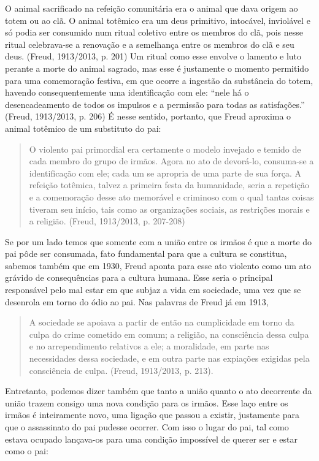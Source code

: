 O animal sacrificado na refeição comunitária era o animal que dava
origem ao totem ou ao clã. O animal totêmico era um deus primitivo,
intocável, inviolável e só podia ser consumido num ritual coletivo entre
os membros do clã, pois nesse ritual celebrava-se a renovação e a
semelhança entre os membros do clã e seu deus. (Freud, 1913/2013, p.
201) Um ritual como esse envolve o lamento e luto perante a morte do
animal sagrado, mas esse é justamente o momento permitido para uma
comemoração festiva, em que ocorre a ingestão da substância do totem,
havendo consequentemente uma identificação com ele: ``nele há o
desencadeamento de todos os impulsos e a permissão para todas as
satisfações.'' (Freud, 1913/2013, p. 206) É nesse sentido, portanto, que
Freud aproxima o animal totêmico de um substituto do pai:

\begin{quote}
O violento pai primordial era certamente o modelo invejado e temido de
cada membro do grupo de irmãos. Agora no ato de devorá-lo, consuma-se a
identificação com ele; cada um se apropria de uma parte de sua força. A
refeição totêmica, talvez a primeira festa da humanidade, seria a
repetição e a comemoração desse ato memorável e criminoso com o qual
tantas coisas tiveram seu início, tais como as organizações sociais, as
restrições morais e a religião. (Freud, 1913/2013, p. 207-208)
\end{quote}

Se por um lado temos que somente com a união entre os irmãos é que a
morte do pai pôde ser consumada, fato fundamental para que a cultura se
constitua, sabemos também que em 1930, Freud aponta para esse ato
violento como um ato grávido de consequências para a cultura humana.
Esse seria o principal responsável pelo mal estar em que subjaz a vida
em sociedade, uma vez que se desenrola em torno do ódio ao pai. Nas
palavras de Freud já em 1913,

\begin{quote}
A sociedade se apoiava a partir de então na cumplicidade em torno da
culpa do crime cometido em comum; a religião, na consciência dessa culpa
e no arrependimento relativos a ele; a moralidade, em parte nas
necessidades dessa sociedade, e em outra parte nas expiações exigidas
pela consciência de culpa. (Freud, 1913/2013, p. 213).
\end{quote}

Entretanto, podemos dizer também que tanto a união quanto o ato
decorrente da união trazem consigo uma nova condição para os irmãos.
Esse laço entre os irmãos é inteiramente novo, uma ligação que passou a
existir, justamente para que o assassinato do pai pudesse ocorrer. Com
isso o lugar do pai, tal como estava ocupado lançava-os para uma
condição impossível de querer ser e estar como o pai:

